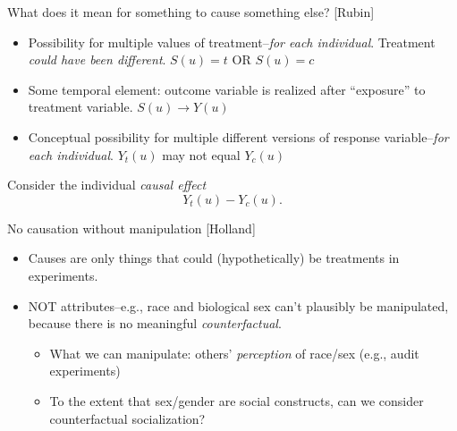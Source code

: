 \documentclass[xcolor={dvipsnames},handout]{beamer}
\begin{document}

\begin{frame}{What does it mean for something to cause something else? [Rubin]}
\citep{rubin1974estimating,rubin1977assignment, rubin1978bayesian, rubin1980discussion, holland1980causal}

\begin{itemize}
\item Possibility for multiple values of treatment--\textit{for each individual}. Treatment \textit{could have been different}. $S(u) = t$ OR $S(u) = c$
\item Some temporal element: outcome variable is realized after ``exposure'' to treatment variable. $S(u)\rightarrow Y(u)$
\item Conceptual possibility for multiple different versions of response variable--\textit{for each individual}. $Y_t(u)$ may not equal $Y_c(u)$
\end{itemize}
Consider the individual \textit{causal effect}
\[
Y_t(u)-Y_c(u).
\]
\end{frame}



\begin{frame}{No causation without manipulation [Holland]}

\begin{itemize}
\item Causes are only things that could (hypothetically) be treatments in experiments. 
\item NOT attributes--e.g., race and biological sex can't plausibly be manipulated, because there is no meaningful \textit{counterfactual}. 
\begin{itemize}
\item What we can manipulate: others' \textit{perception} of race/sex (e.g., audit experiments)%

\item To the extent that sex/gender are social constructs, can we consider counterfactual socialization?
\end{itemize}
\end{itemize}

\end{frame}
\end{document}
